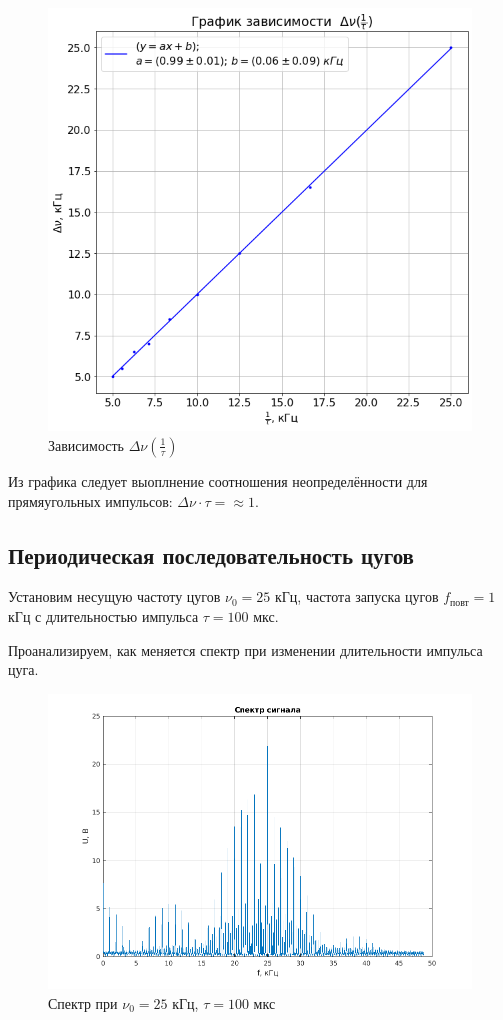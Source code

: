 \documentclass[a4paper, 12pt]{article}%
\begin{document}
\begin{figure}[h!]
    \centering
    \includegraphics[width = 13 cm]{images/1_appr.png}
    \caption{Зависимость $\Delta \nu (\frac{1}{\tau})$}
\end{figure}

Из графика следует выоплнение соотношения неопределённости для прямяугольных импульсов: $\Delta \nu \cdot \tau = \approx 1$.

\subsection{Периодическая последовательность цугов}

Установим несущую частоту цугов $\nu_0 = 25$ кГц, частота запуска цугов $f_{\text{повт}} = 1$ кГц с длительностью импульса $\tau = 100$ мкс.

Проанализируем, как меняется спектр при изменении длительности импульса цуга.

\begin{figure}[h!]
    \centering
    \includegraphics[width = 14 cm]{images/2_100_1.png}
    \caption{Спектр при $\nu_0 = 25$ кГц, $\tau = 100$ мкс}
\end{figure}
\end{document}
